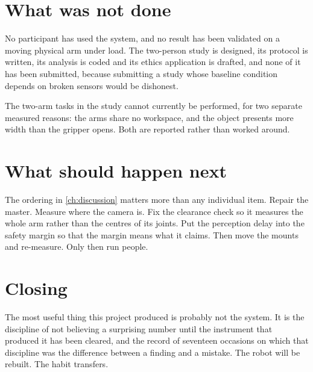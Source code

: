 \section{What was not done}

No participant has used the system, and no result has been validated on a
moving physical arm under load. The two-person study is designed, its
protocol is written, its analysis is coded and its ethics application is
drafted, and none of it has been submitted, because submitting a study whose
baseline condition depends on broken sensors would be dishonest.

The two-arm tasks in the study cannot currently be performed, for two separate
measured reasons: the arms share no workspace, and the object presents more
width than the gripper opens. Both are reported rather than worked around.

\section{What should happen next}

The ordering in \cref{ch:discussion} matters more than any individual item.
Repair the master. Measure where the camera is. Fix the clearance check so it
measures the whole arm rather than the centres of its joints. Put the
perception delay into the safety margin so that the margin means what it
claims. Then move the mounts and re-measure. Only then run people.

\section{Closing}

The most useful thing this project produced is probably not the system. It is
the discipline of not believing a surprising number until the instrument that
produced it has been cleared, and the record of seventeen occasions on which
that discipline was the difference between a finding and a mistake. The robot
will be rebuilt. The habit transfers.
